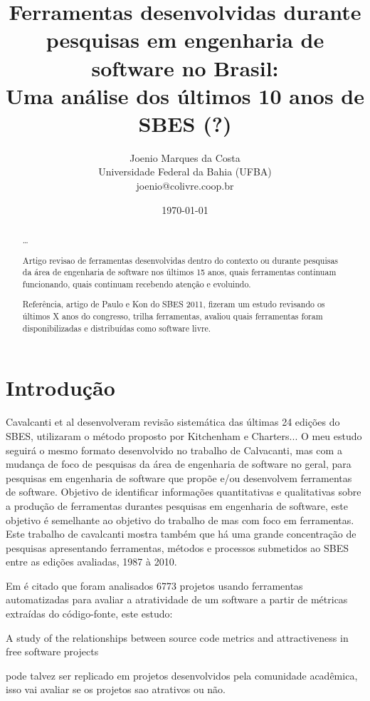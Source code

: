 \documentclass[11pt]{article}
\title{Ferramentas desenvolvidas durante pesquisas em engenharia de software no Brasil: \\
        Uma análise dos últimos 10 anos de SBES (?)
}
\author{Joenio Marques da Costa \\
  {\small Universidade Federal da Bahia (UFBA)} \\
  {\small joenio@colivre.coop.br}
}
\date{\today}
\begin{document}
\maketitle

\begin{abstract}
\dots

Artigo revisao de ferramentas desenvolvidas dentro do contexto ou
durante pesquisas da área de engenharia de software nos últimos 15
anos, quais ferramentas continuam funcionando, quais continuam
recebendo atenção e evoluindo.

Referência, artigo de Paulo e Kon do SBES 2011, fizeram um estudo
revisando os últimos X anos do congresso, trilha ferramentas, avaliou
quais ferramentas foram disponibilizadas e distribuídas como software
livre.

\end{abstract}

\section{Introdução}

Cavalcanti et al\cite{Cavalcanti11} desenvolveram revisão sistemática das
últimas 24 edições do SBES, utilizaram o método proposto por Kitchenham e
Charters\cite{Kitchenham2007}...  O meu estudo seguirá o mesmo formato
desenvolvido no trabalho de Calvacanti\cite{Cavalcanti11}, mas com a mudança
de foco de pesquisas da área de engenharia de software no geral, para
pesquisas em engenharia de software que propõe e/ou desenvolvem ferramentas de
software. Objetivo de identificar informações quantitativas e qualitativas
sobre a produção de ferramentas durantes pesquisas em engenharia de software,
este objetivo é semelhante ao objetivo do trabalho de \cite{Cavalcanti11} mas
com foco em ferramentas. Este trabalho de cavalcanti mostra também que há uma
grande concentração de pesquisas apresentando ferramentas, métodos e processos
submetidos ao SBES entre as edições avaliadas, 1987 à 2010.

Em \cite{Kon11} é citado que foram analisados 6773 projetos usando ferramentas
automatizadas para avaliar a atratividade de um software a partir de métricas
extraídas do código-fonte, este estudo:

A study of the relationships between source code metrics and attractiveness in free software projects

pode talvez ser replicado em projetos desenvolvidos pela comunidade acadêmica,
isso vai avaliar se os projetos sao atrativos ou não.
\end{document}
